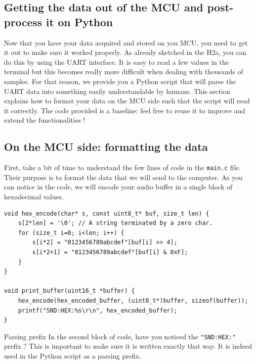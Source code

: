 

\subsection{Getting the data out of the MCU and post-process it on Python}

Now that you have your data acquired and stored on you MCU, you need to get it out to make sure it worked properly. As already sketched in the H2a, you can do this by using the UART interface. It is easy to read a few values in the terminal but this becomes really more difficult when dealing with thousands of samples. For that reason, we provide you a Python script that will parse the UART data into something easily understandable by humans. This section explains how to format your data on the MCU side such that the script will read it correctly. The code provided is a baseline: feel free to reuse it to improve and extend the functionalities !

\subsection*{On the MCU side: formatting the data}
First, take a bit of time to understand the few lines of code in the \texttt{main.c} file. Their purpose is to format the data that we will send to the computer. As you can notice in the code, we will encode your audio buffer in a single block of hexadecimal values.

\begin{lstlisting}[columns=fullflexible]
void hex_encode(char* s, const uint8_t* buf, size_t len) {
    s[2*len] = '\0'; // A string terminated by a zero char.
    for (size_t i=0; i<len; i++) {
        s[i*2] = "0123456789abcdef"[buf[i] >> 4];
        s[i*2+1] = "0123456789abcdef"[buf[i] & 0xF];
    }
}

void print_buffer(uint16_t *buffer) {
	hex_encode(hex_encoded_buffer, (uint8_t*)buffer, sizeof(buffer));
	printf("SND:HEX:%s\r\n", hex_encoded_buffer);
}
\end{lstlisting}

\begin{bclogo}[couleur = gray!20, arrondi = 0.2, logo=\bcinfo]{Parsing prefix}
In the second block of code, have you noticed the \texttt{"SND:HEX:"} prefix ? This is important to make sure it is written exactly that way. It is indeed used in the Python script as a parsing prefix.
\end{bclogo}

